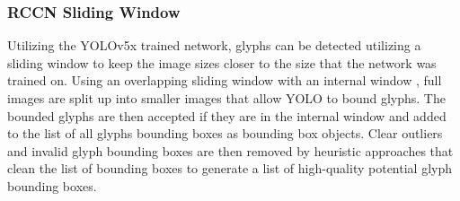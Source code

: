\subsubsection{RCCN Sliding Window}

Utilizing the YOLOv5x trained network, glyphs can be detected utilizing a sliding window to keep the image sizes closer to the size that the network was trained on. Using an overlapping sliding window with an internal window , full images are split up into smaller images that allow YOLO to bound glyphs. The bounded glyphs are then accepted if they are in the internal window and added to the list of all glyphs bounding boxes as bounding box objects. Clear outliers and invalid glyph bounding boxes are then removed by heuristic approaches that clean the list of bounding boxes to generate a list of high-quality potential glyph bounding boxes.

